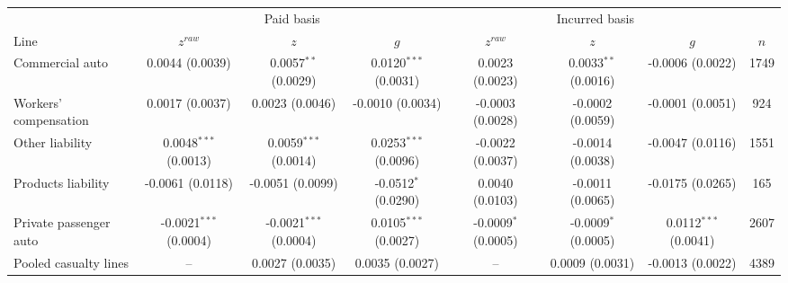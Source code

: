 \begin{tabular}{lccccccc}
\toprule
& \multicolumn{3}{c}{Paid basis} & \multicolumn{3}{c}{Incurred basis} & \\
\cmidrule(lr){2-4}\cmidrule(lr){5-7}
Line & $z^{raw}$ & $z$ & $g$ & $z^{raw}$ & $z$ & $g$ & $n$ \\
\midrule
Commercial auto & 0.0044 (0.0039) & 0.0057$^{**}$ (0.0029) & 0.0120$^{***}$ (0.0031) & 0.0023 (0.0023) & 0.0033$^{**}$ (0.0016) & -0.0006 (0.0022) & 1749 \\
Workers' compensation & 0.0017 (0.0037) & 0.0023 (0.0046) & -0.0010 (0.0034) & -0.0003 (0.0028) & -0.0002 (0.0059) & -0.0001 (0.0051) & 924 \\
Other liability & 0.0048$^{***}$ (0.0013) & 0.0059$^{***}$ (0.0014) & 0.0253$^{***}$ (0.0096) & -0.0022 (0.0037) & -0.0014 (0.0038) & -0.0047 (0.0116) & 1551 \\
Products liability & -0.0061 (0.0118) & -0.0051 (0.0099) & -0.0512$^{*}$ (0.0290) & 0.0040 (0.0103) & -0.0011 (0.0065) & -0.0175 (0.0265) & 165 \\
Private passenger auto & -0.0021$^{***}$ (0.0004) & -0.0021$^{***}$ (0.0004) & 0.0105$^{***}$ (0.0027) & -0.0009$^{*}$ (0.0005) & -0.0009$^{*}$ (0.0005) & 0.0112$^{***}$ (0.0041) & 2607 \\
Pooled casualty lines & -- & 0.0027 (0.0035) & 0.0035 (0.0027) & -- & 0.0009 (0.0031) & -0.0013 (0.0022) & 4389 \\
\bottomrule
\end{tabular}
